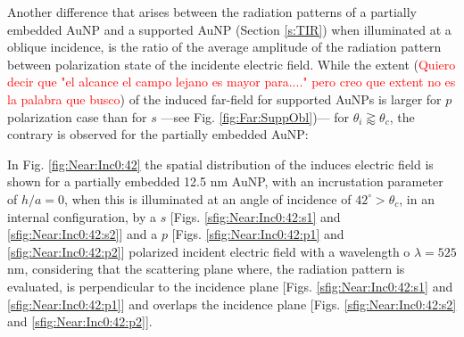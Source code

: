 Another difference that arises between  the radiation patterns of a partially embedded AuNP and a supported AuNP (Section \ref{s:TIR}) when illuminated at a oblique incidence, is the ratio of the  average amplitude of the radiation pattern between polarization state of the incidente electric field. While the extent (\textcolor{red}{Quiero decir que "el alcance el campo lejano es mayor para...." pero creo que extent no es la palabra que busco}) of the induced far-field for supported AuNPs is larger for  $p$ polarization case than for $s$ ---see Fig. \ref{fig:Far:SuppObl})--- for $\theta_i \gtrapprox  \theta_c$, the contrary is observed for the partially embedded AuNP:







In Fig. \ref{fig:Near:Inc0:42} the spatial distribution of the induces electric field is shown for a partially embedded 12.5 nm AuNP, with an incrustation parameter of $h/a = 0$, when this is illuminated at an angle of incidence of $42^\circ>\theta_c$, in an internal configuration, by a $s$ [Figs. \ref{sfig:Near:Inc0:42:s1} and \ref{sfig:Near:Inc0:42:s2}] and a $p$ [Figs. \ref{sfig:Near:Inc0:42:p1} and \ref{sfig:Near:Inc0:42:p2}] polarized incident electric field with a wavelength o $\lambda  =525$ nm, considering that the scattering plane where, the radiation pattern is evaluated, is perpendicular to the incidence plane [Figs. \ref{sfig:Near:Inc0:42:s1} and \ref{sfig:Near:Inc0:42:p1}] and overlaps the incidence plane [Figs. \ref{sfig:Near:Inc0:42:s2} and \ref{sfig:Near:Inc0:42:p2}].


